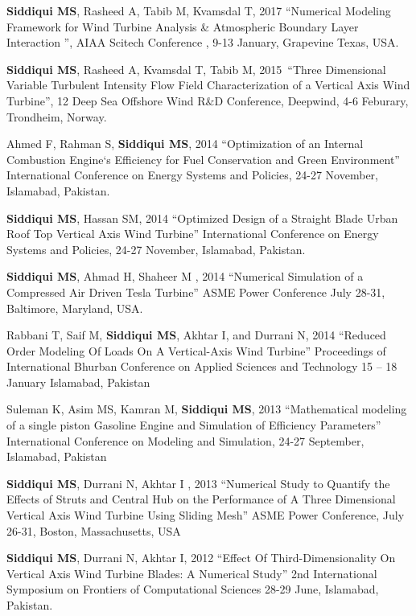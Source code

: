 \begin{cventries}
  \cventry
    {} %
    {} %
    {} %
    {} %
    {
    	\begin{cvitems} 
    		\item{\textbf{Siddiqui MS}, Rasheed A, Tabib M, Kvamsdal T, 2017 “Numerical Modeling Framework for Wind Turbine Analysis \& Atmospheric Boundary Layer Interaction  ”, AIAA Scitech Conference , 9-13 January, Grapevine Texas, USA.}
	        \item {\textbf{Siddiqui MS}, Rasheed A, Kvamsdal T, Tabib M, 2015 “Three Dimensional Variable Turbulent Intensity Flow Field Characterization of a Vertical Axis Wind Turbine”, 12 Deep Sea Offshore Wind R$\&$D Conference, Deepwind, 4-6 Feburary, Trondheim, Norway.}
        \item {Ahmed F, Rahman S, \textbf{Siddiqui MS}, 2014 “Optimization of an Internal Combustion Engine`s Efficiency for Fuel Conservation and Green Environment” International Conference on Energy Systems and Policies, 24-27 November, Islamabad, Pakistan.}
         \item {\textbf{Siddiqui MS}, Hassan SM, 2014 “Optimized Design of a Straight Blade Urban Roof Top Vertical Axis Wind Turbine” International Conference on Energy Systems and Policies, 24-27 November, Islamabad, Pakistan.}
         \item{\textbf{Siddiqui MS}, Ahmad H, Shaheer M , 2014 “Numerical Simulation of a Compressed Air Driven Tesla Turbine” ASME Power Conference July 28-31, Baltimore, Maryland, USA.}
         \item{Rabbani T, Saif M, \textbf{Siddiqui MS}, Akhtar I, and Durrani N, 2014 “Reduced Order Modeling Of Loads On A Vertical-Axis Wind Turbine” Proceedings of International Bhurban Conference on Applied Sciences and Technology 15 – 18 January Islamabad, Pakistan}
          \item{Suleman K, Asim MS, Kamran M, \textbf{Siddiqui MS}, 2013 “Mathematical modeling of a single piston Gasoline Engine and Simulation of Efficiency Parameters” International Conference on Modeling and Simulation, 24-27 September, Islamabad, Pakistan}
          \item{\textbf{Siddiqui MS}, Durrani N, Akhtar I , 2013 “Numerical Study to Quantify the Effects of Struts and Central Hub on the Performance of A Three Dimensional Vertical Axis Wind Turbine Using Sliding Mesh” ASME Power Conference, July 26-31, Boston, Massachusetts, USA}
          \item{\textbf{Siddiqui MS}, Durrani N, Akhtar I, 2012 “Effect Of Third-Dimensionality On Vertical Axis Wind Turbine Blades: A Numerical Study” 2nd International Symposium on Frontiers of Computational Sciences 28-29 June, Islamabad, Pakistan.}

\end{cvitems}}
\end{cventries}
